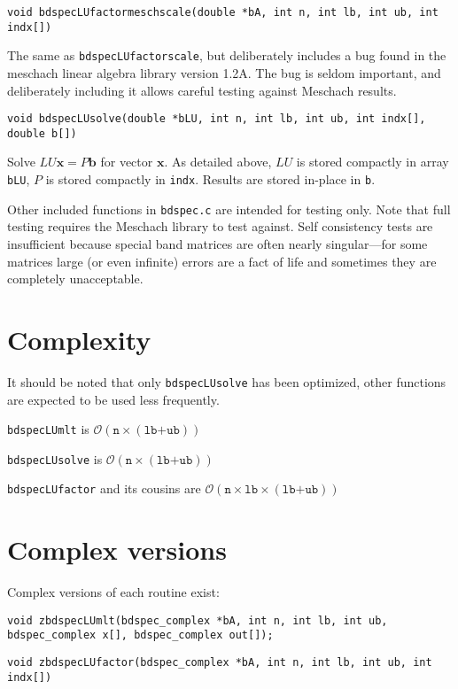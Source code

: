 \documentclass[10pt]{article}
\newcommand{\bfb}{\mathbf{b}}
\newcommand{\bfx}{\mathbf{x}}
\newcommand{\BigO}{\mathcal{O}}
\begin{document}
\texttt{void bdspecLUfactormeschscale(double *bA, int n, int lb, int ub, int indx[])}

The same as \texttt{bdspecLUfactorscale},
but deliberately includes a bug found in the meschach linear algebra library
version 1.2A. The bug is seldom important, and deliberately including it allows careful
testing against Meschach results.
\vspace{1em}

\texttt{void bdspecLUsolve(double *bLU, int n, int lb, int ub, int indx[], double b[])}

Solve $LU\bfx = P\bfb$ for vector $\bfx$. As detailed above, $LU$ is stored
compactly in array \texttt{bLU}, $P$ is stored compactly in \texttt{indx}.
Results are stored in-place in \texttt{b}.

\vspace{1em}

Other included functions in \texttt{bdspec.c} are intended for testing only.
Note that full testing requires the Meschach library to test against.  Self
consistency tests are insufficient because special band matrices are
often nearly singular---for some matrices large (or even infinite) errors are
a fact of life and sometimes they are completely unacceptable.

\section{Complexity}

It should be noted that only \texttt{bdspecLUsolve} has been optimized, other
functions are expected to be used less frequently.

\texttt{bdspecLUmlt} is $\BigO\left(\texttt{n}\times(\texttt{lb+ub})\right)$

\texttt{bdspecLUsolve} is $\BigO\left(\texttt{n}\times(\texttt{lb+ub})\right)$

\texttt{bdspecLUfactor} and its cousins are 
$\BigO\left(\texttt{n}\times\texttt{lb}\times(\texttt{lb+ub})\right)$

\section{Complex versions}

Complex versions of each routine exist:

\texttt{void zbdspecLUmlt(bdspec\_complex *bA, int n, int lb, int ub, bdspec\_complex x[], bdspec\_complex out[]);}

\texttt{void zbdspecLUfactor(bdspec\_complex *bA, int n, int lb, int ub, int indx[])}
\end{document}
